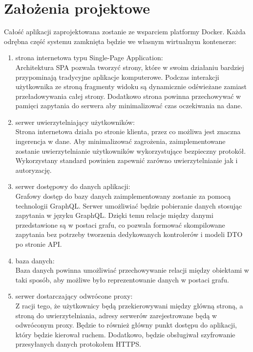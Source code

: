 \section{Założenia projektowe}
	Całość aplikacji zaprojektowana zostanie ze wsparciem platformy Docker.
	Każda odrębna część systemu zamknięta będzie we własnym wirtualnym kontenerze:
	\begin{enumerate}
		\item strona internetowa typu Single-Page Application:\\
			Architektura SPA pozwala tworzyć strony, które w swoim działaniu bardziej przypominają tradycyjne aplikacje komputerowe.
			Podczas interakcji użytkownika ze stroną fragmenty widoku są dynamicznie odświeżane zamiast przeładowywania całej strony.
			Dodatkowo strona powinna przechowywać w pamięci zapytania do serwera aby minimalizować czas oczekiwania na dane.

		\item serwer uwierzytelniający użytkowników:\\
			Strona internetowa działa po stronie klienta, przez co możliwa jest znaczna ingerencja w dane.
			Aby minimalizować zagrożenia, zaimplementowane zostanie uwierzytelnianie użytkowników wykorzystujące bezpieczny protokół.
			Wykorzystany standard powinien zapewnić zarówno uwierzytelnianie jak i autoryzację.

		\item serwer dostępowy do danych aplikacji:\\
			Grafowy dostęp do bazy danych zaimplementowany zostanie za pomocą technologii GraphQL.
			Serwer umożliwiać będzie pobieranie danych stosując zapytania w języku GraphQL\@.
			Dzięki temu relacje między danymi przedstawione są w postaci grafu,
			co pozwala formować skompilowane zapytania bez potrzeby tworzenia dedykowanych kontrolerów i modeli DTO po stronie API\@.

		\item baza danych:\\
			Baza danych powinna umożliwiać przechowywanie relacji między obiektami w taki sposób,
			aby możliwe było reprezentowanie danych w postaci grafu.

		\item serwer dostarczający odwrócone proxy:\\
			Z racji tego, że użytkownicy będą przekierowywani między główną stroną, a stroną do uwierzytelniania,
			adresy serwerów zarejestrowane będą w odwróconym proxy.
			Będzie to również główny punkt dostępu do aplikacji, który będzie kierował ruchem.
			Dodatkowo, będzie obsługiwał szyfrowanie przesyłanych danych protokołem HTTPS\@.

	\end{enumerate}
		